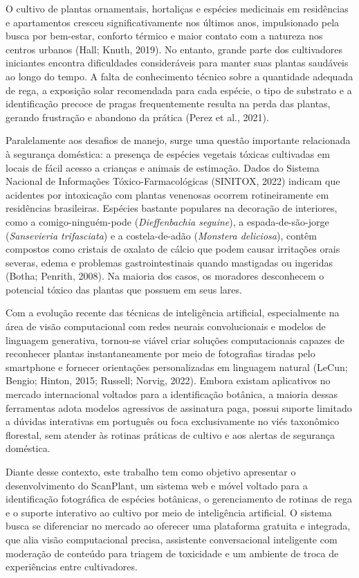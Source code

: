 \documentclass[12pt,a4paper]{article}
\begin{document}
O cultivo de plantas ornamentais, hortaliças e espécies medicinais em residências e apartamentos cresceu significativamente nos últimos anos, impulsionado pela busca por bem-estar, conforto térmico e maior contato com a natureza nos centros urbanos (Hall; Knuth, 2019). No entanto, grande parte dos cultivadores iniciantes encontra dificuldades consideráveis para manter suas plantas saudáveis ao longo do tempo. A falta de conhecimento técnico sobre a quantidade adequada de rega, a exposição solar recomendada para cada espécie, o tipo de substrato e a identificação precoce de pragas frequentemente resulta na perda das plantas, gerando frustração e abandono da prática (Perez et al., 2021).

Paralelamente aos desafios de manejo, surge uma questão importante relacionada à segurança doméstica: a presença de espécies vegetais tóxicas cultivadas em locais de fácil acesso a crianças e animais de estimação. Dados do Sistema Nacional de Informações Tóxico-Farmacológicas (SINITOX, 2022) indicam que acidentes por intoxicação com plantas venenosas ocorrem rotineiramente em residências brasileiras. Espécies bastante populares na decoração de interiores, como a comigo-ninguém-pode (\textit{Dieffenbachia seguine}), a espada-de-são-jorge (\textit{Sansevieria trifasciata}) e a costela-de-adão (\textit{Monstera deliciosa}), contêm compostos como cristais de oxalato de cálcio que podem causar irritações orais severas, edema e problemas gastrointestinais quando mastigadas ou ingeridas (Botha; Penrith, 2008). Na maioria dos casos, os moradores desconhecem o potencial tóxico das plantas que possuem em seus lares.

Com a evolução recente das técnicas de inteligência artificial, especialmente na área de visão computacional com redes neurais convolucionais e modelos de linguagem generativa, tornou-se viável criar soluções computacionais capazes de reconhecer plantas instantaneamente por meio de fotografias tiradas pelo smartphone e fornecer orientações personalizadas em linguagem natural (LeCun; Bengio; Hinton, 2015; Russell; Norvig, 2022). Embora existam aplicativos no mercado internacional voltados para a identificação botânica, a maioria dessas ferramentas adota modelos agressivos de assinatura paga, possui suporte limitado a dúvidas interativas em português ou foca exclusivamente no viés taxonômico florestal, sem atender às rotinas práticas de cultivo e aos alertas de segurança doméstica.

Diante desse contexto, este trabalho tem como objetivo apresentar o desenvolvimento do ScanPlant, um sistema web e móvel voltado para a identificação fotográfica de espécies botânicas, o gerenciamento de rotinas de rega e o suporte interativo ao cultivo por meio de inteligência artificial. O sistema busca se diferenciar no mercado ao oferecer uma plataforma gratuita e integrada, que alia visão computacional precisa, assistente conversacional inteligente com moderação de conteúdo para triagem de toxicidade e um ambiente de troca de experiências entre cultivadores.
\end{document}
